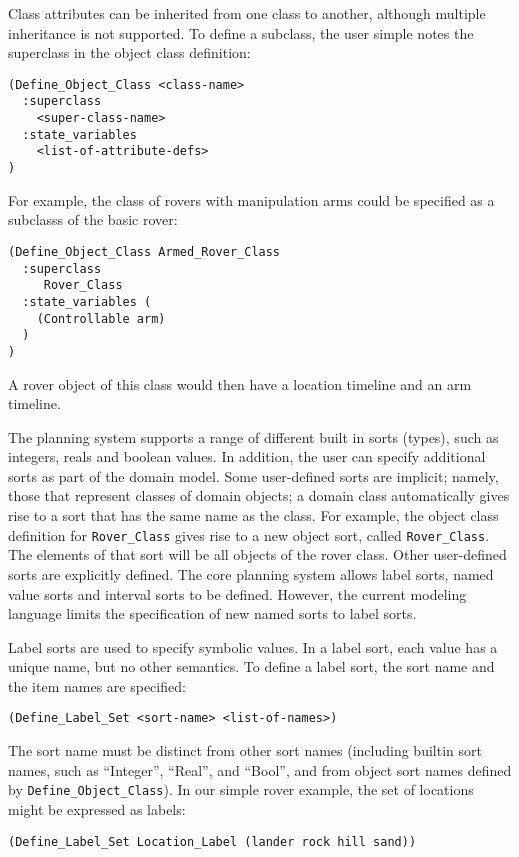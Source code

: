 Class attributes can be inherited from one class to another, although
multiple inheritance is not supported.  To define a subclass, the user
simple notes the superclass in the object class definition:
  \begin{verbatim}
(Define_Object_Class <class-name>
  :superclass
    <super-class-name>
  :state_variables
    <list-of-attribute-defs>
)  \end{verbatim}
  For example, the class of rovers with manipulation arms could be
specified as a subclasss of the basic rover:
  \begin{verbatim}
(Define_Object_Class Armed_Rover_Class
  :superclass
     Rover_Class
  :state_variables (
    (Controllable arm)
  )
)  \end{verbatim}
  A rover object of this class would then have a location timeline and
an arm timeline.



The planning system supports a range of different built in sorts
(types), such as integers, reals and boolean values.  In addition, the
user can specify additional sorts as part of the domain model.  Some
user-defined sorts are implicit; namely, those that represent classes
of domain objects; a domain class automatically gives rise to a sort
that has the same name as the class.  For example, the object class
definition for {\tt Rover\_Class} gives rise to a new object sort,
called {\tt Rover\_Class}.  The elements of that sort will be all
objects of the rover class.  Other user-defined sorts are explicitly
defined.  The core planning system allows label sorts, named value
sorts and interval sorts to be defined.  However, the current modeling
language limits the specification of new named sorts to label sorts.

Label sorts are used to specify symbolic values.  In a label sort,
each value has a unique name, but no other semantics.  To define a
label sort, the sort name and the item names are specified:
  \begin{verbatim}
(Define_Label_Set <sort-name> <list-of-names>)\end{verbatim}
  The sort name must be distinct from other sort names (including
builtin sort names, such as ``Integer'', ``Real'', and ``Bool'', and from
object sort names defined by {\tt Define\_Object\_Class}).
In our simple rover example, the set of locations might be expressed
as labels:
  \begin{verbatim}
(Define_Label_Set Location_Label (lander rock hill sand))\end{verbatim}

